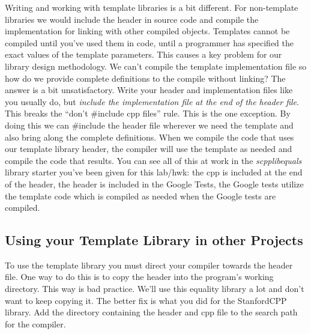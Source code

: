 \documentclass[10pt]{article}
\begin{document}
Writing and working with template libraries is a bit different. For non-template libraries we would include the header in source code and compile the implementation for linking with other compiled objects. Templates cannot be compiled until you've used them in code, until a programmer has specified the exact values of the template parameters. This causes a key problem for our library design methodology. We can't compile the template implementation file so how do we provide complete definitions to the compile without linking?  The answer is a bit unsatisfactory.  Write your header and implementation files like you usually do, but \textit{include the implementation file at the end of the header file}.  This breaks the ``don't \#include cpp files'' rule. This is the one exception. By doing this we can \#include the header file wherever we need the template and also bring along the complete definitions.  When we compile the code that uses our template library header, the compiler will use the template as needed and compile the code that results. You can see all of this at work in the \textit{scpplibequals} library starter you've been given for this lab/hwk: the cpp is included at the end of the header, the header is included in the Google Tests, the Google tests utilize the template code which is compiled as needed when the Google tests are compiled.

\subsection{Using your Template Library in other Projects}

To use the template library you must direct your compiler towards the header file.  One way to do this is to copy the header into the program's working directory. This way is bad practice. We'll use this equality library a lot and don't want to keep copying it. The better fix is what you did for the StanfordCPP library.  Add the directory containing the header and cpp file to the search path for the compiler. 
\end{document}
